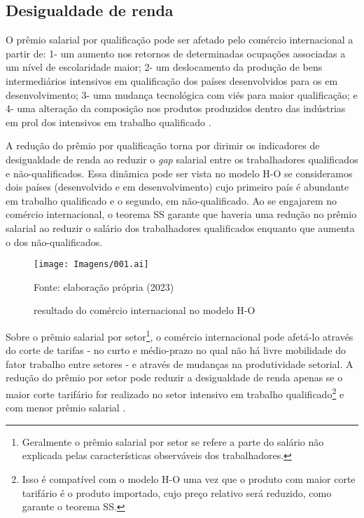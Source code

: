 \subsection{Desigualdade de renda} \label{subsec:desigualdade_renda}

O prêmio salarial por qualificação pode ser afetado pelo comércio internacional a partir de: 1- um aumento nos retornos de determinadas ocupações associadas a um nível de escolaridade maior; 2- um deslocamento da produção de bens intermediários intensivos em qualificação dos países desenvolvidos para os em desenvolvimento; 3- uma mudança tecnológica com viés para maior qualificação; e 4- uma alteração da composição nos produtos produzidos dentro das indústrias em prol dos intensivos em trabalho qualificado \cite{goldbergpavcnik04}.

A redução do prêmio por qualificação torna por dirimir os indicadores de desigualdade de renda ao reduzir o \textit{gap} salarial entre os trabalhadores qualificados e não-qualificados. Essa dinâmica pode ser vista no modelo H-O se consideramos dois países (desenvolvido e em desenvolvimento) cujo primeiro país é abundante em trabalho qualificado e o segundo, em não-qualificado. Ao se engajarem no comércio internacional, o teorema SS garante que haveria uma redução no prêmio salarial ao reduzir o salário dos trabalhadores qualificados enquanto que aumenta o dos não-qualificados.

\begin{figure}[h]
	\centering
	\texttt{[image: Imagens/001.ai]}
	\caption{resultado do comércio internacional no modelo H-O}
	\label{fig:modelo_h-o}
	\footnotesize
	Fonte: elaboração própria (2023)
\end{figure}

Sobre o prêmio salarial por setor\footnote{Geralmente o prêmio salarial por setor se refere a parte do salário não explicada pelas características observáveis dos trabalhadores.}, o comércio internacional pode afetá-lo através do corte de tarifas - no curto e médio-prazo no qual não há livre mobilidade do fator trabalho entre setores - e através de mudanças na produtividade setorial. A redução do prêmio por setor pode reduzir a desigualdade de renda apenas se o maior corte tarifário for realizado no setor intensivo em trabalho qualificado\footnote{Isso é compatível com o modelo H-O uma vez que o produto com maior corte tarifário é o produto importado, cujo preço relativo será reduzido, como garante o teorema SS.} e com menor prêmio salarial \cite{goldbergpavcnik04}.

